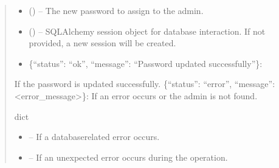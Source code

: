 \documentclass[letterpaper,10pt,english]{sphinxmanual}
\begin{document}
\begin{fulllineitems}
\begin{fulllineitems}
\begin{quote}
\begin{description}
\begin{itemize}
\item {} 
\sphinxAtStartPar
{} () – The new password to assign to the admin.

\item {} 
\sphinxAtStartPar
{} (\sphinxstyleliteralemphasis{\sphinxupquote{, }}) – SQLAlchemy session object for database interaction.
If not provided, a new session will be created.

\end{itemize}

\sphinxAtStartPar
\begin{description}
\begin{itemize}
\item {} 
\sphinxAtStartPar
\{“status”: “ok”, “message”: “Password updated successfully”\}:

\end{itemize}

\sphinxAtStartPar
If the password is updated successfully.
\sphinxhyphen{} \{“status”: “error”, “message”: <error\_message>\}:
If an error occurs or the admin is not found.

\end{description}


\sphinxAtStartPar
dict

\begin{itemize}
\item {} 
\sphinxAtStartPar
{} – If a database\sphinxhyphen{}related error occurs.

\item {} 
\sphinxAtStartPar
{} – If an unexpected error occurs during the operation.

\end{itemize}

\end{description}\end{quote}

\end{fulllineitems}


\end{fulllineitems}
\end{document}
